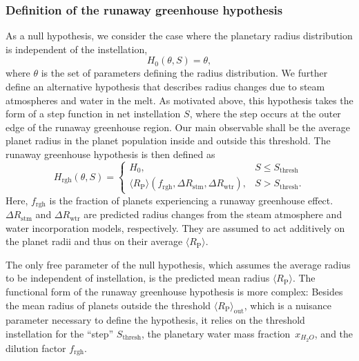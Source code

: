 \documentclass[modern]{aastex631}
\begin{document}
\subsubsection{Definition of the runaway greenhouse hypothesis}
\begin{note}
\end{note}
    As a null hypothesis, we consider the case where the planetary radius distribution is independent of the instellation,
    \begin{equation}
        H_0(\theta, S) = \theta,
    \end{equation}
    where $\theta$ is the set of parameters defining the radius distribution.
    We further define an alternative hypothesis that describes radius changes due to steam atmospheres and water in the melt.
    As motivated above, this hypothesis takes the form of a step function in net instellation $S$, where the step occurs at the outer edge of the runaway greenhouse region.
    Our main observable shall be the average planet radius in the planet population inside and outside this threshold.
    The runaway greenhouse hypothesis is then defined as
\begin{equation}\label{eq:rgh_hypo}
    H_{\mathrm{rgh}}(\theta, S) =
        \begin{cases}
            H_0, &  S \leq S_\mathrm{thresh}\\
            \langle R_\mathrm{P}\rangle (f_\mathrm{rgh},\Delta R_\mathrm{stm}, \Delta R_\mathrm{wtr}), &  S > S_\mathrm{thresh}.
        \end{cases}
\end{equation}
    Here, $f_\mathrm{rgh}$ is the fraction of planets experiencing a runaway greenhouse effect.
    $\Delta R_\mathrm{stm}$ and $\Delta R_\mathrm{wtr}$ are predicted radius changes from the steam atmosphere and water incorporation models, respectively.
    They are assumed to act additively on the planet radii and thus on their average $\langle R_\mathrm{P}\rangle $.

The only free parameter of the null hypothesis, which assumes the average radius to be independent of instellation, is the predicted mean radius $\langle R_\mathrm{P}\rangle $.
The functional form of the runaway greenhouse hypothesis is more complex: Besides the mean radius of planets outside the threshold $\langle R_\mathrm{P}\rangle_\mathrm{out}$, which is a nuisance parameter necessary to define the hypothesis, it relies on the threshold instellation for the ``step'' $S_\mathrm{thresh}$, the planetary water mass fraction~$x_{H_2O}$, and the dilution factor $f_\mathrm{rgh}$.
\end{document}
